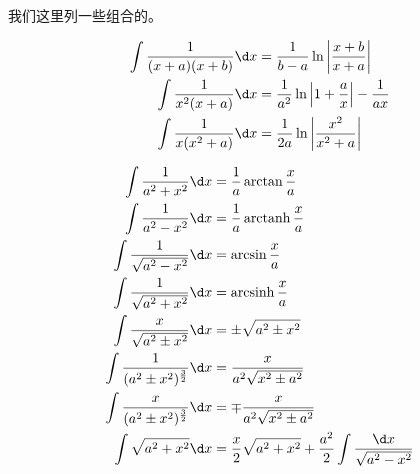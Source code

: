 我们这里列一些组合的。



\begin{example}[有理式]
	\[ \begin{aligned}
			\int \frac{1}{(x+a)(x+b)} \d x & = \frac{1}{b-a} \ln \left| \frac{x+b}{x+a} \right|                \\
			\int \frac{1}{x^2(x+a)}   \d x & = \frac{1}{a^2} \ln \left| 1 + \frac{a}{x} \right| - \frac{1}{ax} \\
			\int \frac{1}{x(x^2+a)}   \d x & = \frac{1}{2a} \ln \left| \frac{x^2}{x^2+a}\right|
		\end{aligned} \]
\end{example}

\begin{example}[带 $a^2 \pm x^2$]
	\[ \begin{aligned}
			\int \frac{1}{a^2+x^2} \d x                     & = \frac{1}{a} \arctan \frac{x}{a}                                                    \\
			\int \frac{1}{a^2 - x^2} \d x                   & = \frac{1}{a} \arctanh \frac{x}{a} \\
			\int \frac{1}{\sqrt{a^2 - x^2}} \d x            & = \arcsin \frac{x}{a}                                                                \\
			\int \frac{1}{\sqrt{a^2 + x^2}} \d x            & = \arcsinh \frac{x}{a}                     \\
			\int \frac{x}{\sqrt{a^2 \pm x^2}} \d x          & = \pm\sqrt{a^2 \pm x^2}                                                              \\
			\int \frac{1}{(a^2 \pm x^2)^{\frac{3}{2}}} \d x & = \frac{x}{a^2\sqrt{x^2 \pm a^2}}                                                    \\
			\int \frac{x}{(a^2 \pm x^2)^{\frac{3}{2}}} \d x & = \mp \frac{x}{a^2\sqrt{x^2 \pm a^2}}                                                \\
			\int \sqrt{a^2 + x^2} \d x                      & = \frac{x}{2}  \sqrt{a^2+x^2}+\frac{a^2}{2} \int \frac{\d x}{\sqrt{a^2-x^2}}
		\end{aligned} \]
\end{example}

